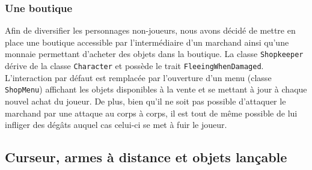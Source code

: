 \documentclass[10pt,a4paper]{article}
\begin{document}
\subsubsection{Une boutique}
Afin de diversifier les personnages non-joueurs, nous avons décidé de mettre en place une boutique accessible par l'intermédiaire d'un marchand ainsi qu'une monnaie permettant d'acheter des objets dans la boutique. La classe \texttt{Shopkeeper} dérive de la classe \texttt{Character} et possède le trait \texttt{FleeingWhenDamaged}. L'interaction par défaut est remplacée par l'ouverture d'un menu (classe \texttt{ShopMenu}) affichant les objets disponibles à la vente et se mettant à jour à chaque nouvel achat du joueur. De plus, bien qu'il ne soit pas possible d'attaquer le marchand par une attaque au corps à corps, il est tout de même possible de lui infliger des dégâts auquel cas celui-ci se met à fuir le joueur.

\subsection{Curseur, armes à distance et objets lançable}
\end{document}
